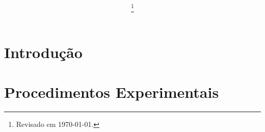 \documentclass[journal,compsoc]{IEEEtran}
\makeatletter
\def\markboth#1#2{\def\leftmark{\@IEEEcompsoconly{\sffamily}\MakeUppercase{\protect#1}}%
\def\rightmark{\@IEEEcompsoconly{\sffamily}\MakeUppercase{\protect#2}}}
\makeatother
\begin{document}
	\title{%
	\hell\\\ver}
	\author{
\allnames\\
\allmatriculas
\thanks{Revisado em \today.}
	}

	\markboth{Universidade de Bras\'ilia - Campus Gama - FGA, \entrega}%
	{Shell \MakeLowercase{\textit{et al.}}: \ver}

	\IEEEcompsoctitleabstractindextext{%
	\begin{abstract}
		
	\end{abstract}
	\begin{IEEEkeywords} %
		\keyw %
	\end{IEEEkeywords}}

	\maketitle

	\IEEEdisplaynotcompsoctitleabstractindextext
	\IEEEpeerreviewmaketitle


	\section{Introdução}\label{intro}
		
	
	\section{Procedimentos Experimentais}\label{hardsoft}
		
	
\end{document}
